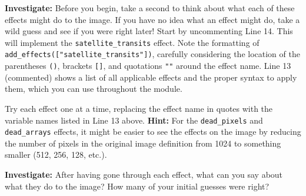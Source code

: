\documentclass[14pt]{article}
\newcommand{\questionspace}[1]{\vspace{30mm}}
\begin{document}
    \item \textbf{Investigate:} Before you begin, take a second to think about what each of these effects might do to the image. If you have no idea what an effect might do, take a wild guess and see if you were right later! \questionspace

    \item Start by uncommenting Line 14. This will implement the \texttt{satellite\_transits} effect. Note the formatting of \texttt{add\_effects(["satellite\_transits"])}, carefully considering the location of the parentheses \texttt{()}, brackets \texttt{[]}, and quotations \texttt{""} around the effect name. Line 13 (commented) shows a list of all applicable effects and the proper syntax to apply them, which you can use throughout the module.
    \item Try each effect one at a time, replacing the effect name in quotes with the variable names listed in Line 13 above. 
    \subitem \textbf{Hint:} For the \texttt{dead\_pixels} and \texttt{dead\_arrays} effects, it might be easier to see the effects on the image by reducing the number of pixels in the original image definition from 1024 to something smaller (512, 256, 128, etc.).
    \item \textbf{Investigate:} After having gone through each effect, what can you say about what they do to the image? How many of your initial guesses were right?
    \questionspace
    
\end{enumerate}
\end{document}

